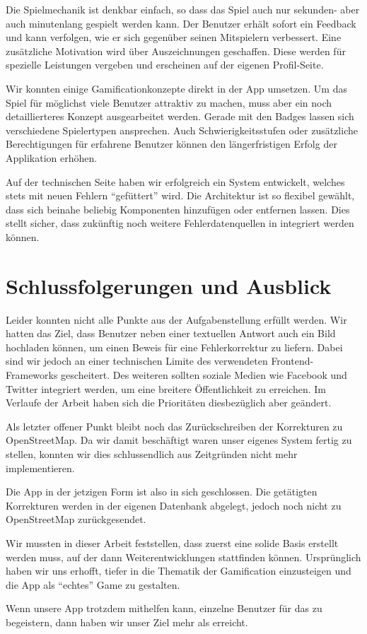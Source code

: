 Die Spielmechanik ist denkbar einfach, so dass das Spiel auch nur sekunden- aber auch  minutenlang gespielt werden kann.
Der Benutzer erhält sofort ein Feedback und kann verfolgen, wie er sich gegenüber seinen Mitspielern verbessert.
Eine zusätzliche Motivation wird über Auszeichnungen geschaffen.
Diese werden für spezielle Leistungen vergeben und erscheinen auf der eigenen Profil-Seite.

Wir konnten einige Gamificationkonzepte direkt in der App umsetzen.
Um das Spiel für möglichst viele Benutzer attraktiv zu machen, muss aber ein noch detaillierteres Konzept ausgearbeitet werden.
Gerade mit den Badges lassen sich verschiedene Spielertypen ansprechen.
Auch Schwierigkeitsstufen oder zusätzliche Berechtigungen für erfahrene Benutzer können den längerfristigen Erfolg der Applikation erhöhen.

Auf der technischen Seite haben wir erfolgreich ein System entwickelt, welches stets mit neuen Fehlern "`gefüttert"' wird.
Die Architektur ist so flexibel gewählt, dass sich beinahe beliebig Komponenten hinzufügen oder entfernen lassen.
Dies stellt sicher, dass zukünftig noch weitere Fehlerdatenquellen in \kort integriert werden können.

\section{Schlussfolgerungen und Ausblick}
Leider konnten nicht alle Punkte aus der Aufgabenstellung erfüllt werden.
Wir hatten das Ziel, dass Benutzer neben einer textuellen Antwort auch ein Bild hochladen können, um einen Beweis für eine Fehlerkorrektur zu liefern.
Dabei sind wir jedoch an einer technischen Limite des verwendeten Frontend-Frameworks  gescheitert.
Des weiteren sollten soziale Medien wie Facebook und Twitter integriert werden, um eine breitere Öffentlichkeit zu erreichen.
Im Verlaufe der Arbeit haben sich die Prioritäten diesbezüglich aber geändert.

Als letzter offener Punkt bleibt noch das Zurückschreiben der Korrekturen zu \gls{OpenStreetMap}.
Da wir damit beschäftigt waren unser eigenes System fertig zu stellen, konnten wir dies schlussendlich aus Zeitgründen nicht mehr implementieren.

Die App in der jetzigen Form ist also in sich geschlossen. Die getätigten Korrekturen werden in der eigenen Datenbank abgelegt, jedoch noch nicht zu \gls{OpenStreetMap} zurückgesendet.

Wir mussten in dieser Arbeit feststellen, dass zuerst eine solide Basis erstellt werden muss, auf der dann Weiterentwicklungen stattfinden können.
Ursprünglich haben wir uns erhofft, tiefer in die Thematik der \gls{Gamification} einzusteigen und die App als "`echtes"' Game zu gestalten.

Wenn unsere App trotzdem mithelfen kann, einzelne Benutzer für das  zu begeistern, dann haben wir unser  Ziel mehr als erreicht.